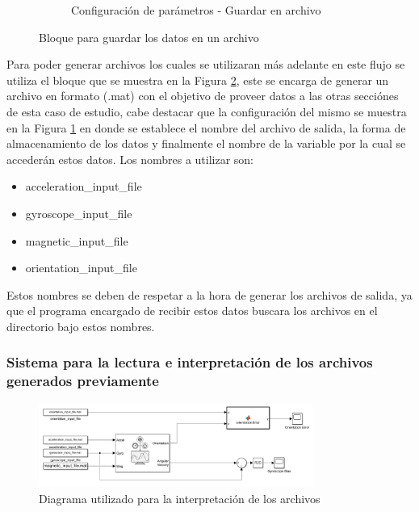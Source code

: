 \begin{figure}[htbp]
\begin{subfigure}[b]{0.45\textwidth}
        \caption{Configuración de parámetros - Guardar en archivo}
        \label{fig:config_to_file_IMU}
    \end{subfigure}
    \caption{Bloque para guardar los datos en un archivo}
    \label{fig:to_file_IMU}
\end{figure}

Para poder generar archivos los cuales se utilizaran más adelante en este flujo se utiliza el bloque que se muestra en la Figura \ref{fig:to_file_IMU}, este se encarga de generar un archivo en formato (.mat) con el objetivo de proveer datos a las otras secciónes de esta caso de estudio, cabe destacar que la configuración del mismo se muestra en la Figura \ref{fig:config_to_file_IMU} en donde se establece el nombre del archivo de salida, la forma de almacenamiento de los datos y finalmente el nombre de la variable por la cual se accederán estos datos. Los nombres a utilizar son:

\begin{itemize}
    \item acceleration\_input\_file
    \item gyroscope\_input\_file
    \item magnetic\_input\_file
    \item orientation\_input\_file
\end{itemize}

Estos nombres se deben de respetar a la hora de generar los archivos de salida, ya que el programa encargado de recibir estos datos buscara los archivos en el directorio bajo estos nombres.

\subsubsection{Sistema para la lectura e interpretación de los archivos generados previamente}

\begin{figure}[h!]
    \centering
    \includegraphics[width=0.8\textwidth]{fig/Capitulo5/Caso_de_estudio_IMU/Generador_de_salidas/flujo_lector_de_archivos.pdf}
    \caption{Diagrama utilizado para la interpretación de los archivos \cite{mathworks2024imu}}
    \label{fig:caso_de_estudio_2_IMU_interpretacion_de_archivos}
\end{figure}


